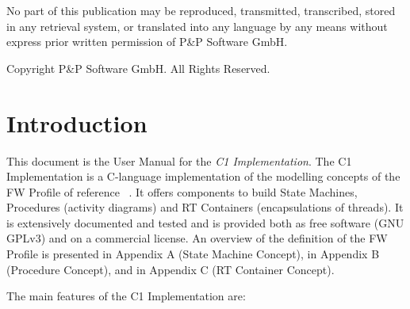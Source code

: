 \documentclass[a4paper,10pt]{article}
\let\stdsection\section
\renewcommand\section{\newpage\stdsection}
\begin{document}
\newpage
\tableofcontents

\newpage
\listoffigures
\listoftables
\lstlistoflistings

\newpage
\vspace*{\fill}
\begin{center}
No part of this publication may be reproduced, transmitted, transcribed, stored in any retrieval system, or translated into any language
by any means without express prior written permission of P\&P Software GmbH.
\end{center}

\begin{center}
Copyright  P\&P Software GmbH. All Rights Reserved. 
\end{center}
\vspace*{\fill}

\setlength{\parskip}{3mm}						%

\section{Introduction}
This document is the User Manual for the \emph{C1 Implementation}. 
The C1 Implementation is a C-language implementation of the modelling concepts of the FW Profile of reference ~\cite{ref:fwprofile}. It offers components to build State Machines, Procedures (activity diagrams) and RT Containers (encapsulations of threads). It is extensively documented and tested and is provided both as free software (GNU GPLv3) and on a commercial license. An overview of the definition of the FW Profile is presented in Appendix A (State Machine Concept), in Appendix B (Procedure Concept), and in Appendix C (RT Container Concept).  

The main features of the C1 Implementation are:



\end{document}
